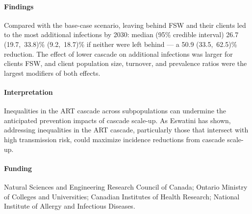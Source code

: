 \paragraph{Findings}
Compared with the base-case scenario, leaving behind FSW and their clients
led to the most additional infections by 2030: median (95\% credible interval)
26.7 (19.7,~33.8)\%  (9.2,~18.7)\% if neither were left behind
--- a 50.9 (33.5,~62.5)\% reduction.
The effect of lower cascade on additional infections was larger for clients \vs FSW, and
client population size, turnover, and prevalence ratios were the largest modifiers of both effects.
\paragraph{Interpretation}
Inequalities in the ART cascade across subpopulations
can undermine the anticipated prevention impacts of cascade scale-up.
As Eswatini has shown,
addressing inequalities in the ART cascade,
particularly those that intersect with high transmission risk,
could maximize incidence reductions from cascade scale-up.
\paragraph{Funding}
Natural Sciences and Engineering Research Council of Canada;
Ontario Ministry of Colleges and Universities;
Canadian Institutes of Health Research;
National Institute of Allergy and Infectious Diseases.
